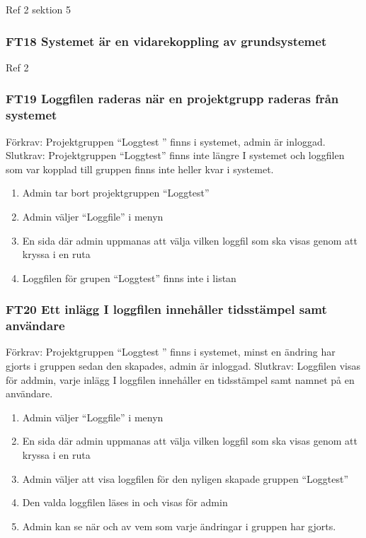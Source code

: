 \documentclass[paper=a4, fontsize=11pt,twoside]{article}
\begin{document}
		Ref 2 sektion 5
		
		
		
		\subsubsection*{FT18 Systemet är en vidarekoppling av grundsystemet}
	
		Ref 2
	
		\subsubsection*{ FT19 Loggfilen raderas när en projektgrupp raderas från
		systemet}

		Förkrav:  Projektgruppen “Loggtest ” finns i systemet, admin är inloggad.
		\newline
		Slutkrav: Projektgruppen “Loggtest” finns inte längre I systemet och loggfilen
		som var kopplad till gruppen finns inte heller kvar i systemet.
		
		
		\begin{enumerate}
		  \item       Admin tar bort projektgruppen “Loggtest”
		  \item      Admin väljer “Loggfile” i menyn
		  \item       En sida där admin uppmanas att välja vilken loggfil som ska visas genom att kryssa i en ruta
		  \item      Loggfilen för grupen “Loggtest” finns inte i listan
		  
		  
		\end{enumerate}
		
		
		
		\subsubsection*{ FT20 Ett inlägg I loggfilen innehåller tidsstämpel samt
		användare}
		
		Förkrav: Projektgruppen “Loggtest ” finns i systemet, minst en ändring har
		gjorts i gruppen sedan den skapades, admin är inloggad.
		\newline
		Slutkrav: Loggfilen visas för addmin, varje inlägg I loggfilen innehåller en
		tidsstämpel samt namnet på en användare.
		
		
		\begin{enumerate}
		  \item     Admin väljer “Loggfile” i menyn
		  \item      En sida där admin uppmanas att välja vilken loggfil som ska visas genom att kryssa i en ruta
		  \item    Admin väljer att visa loggfilen för den nyligen skapade gruppen “Loggtest”
		  \item     Den valda loggfilen läses in och visas för admin
		  \item      Admin kan se när och av vem som varje ändringar i gruppen har
		  gjorts.
		  
		\end{enumerate}
		
\end{document}

